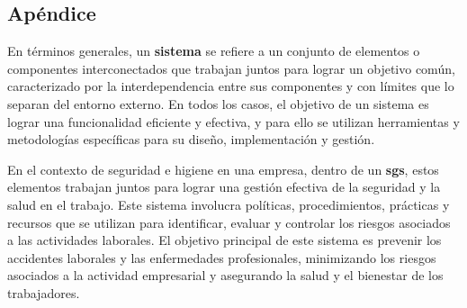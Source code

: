 \subsection{Apéndice}

En términos generales, un \textbf{\gls{sistema}} se refiere a un conjunto de
elementos o componentes interconectados que trabajan juntos para lograr un 
objetivo común, caracterizado por la interdependencia entre sus componentes y 
con límites que lo separan del entorno externo. En todos los casos, el objetivo
de un sistema es lograr una funcionalidad eficiente y efectiva, y para ello se
utilizan herramientas y metodologías específicas para su diseño, implementación
y gestión.

En el contexto de seguridad e higiene en una empresa, dentro de un 
\textbf{\gls{sgs}}, estos elementos trabajan juntos para lograr una gestión 
efectiva de la seguridad y la salud en el trabajo. Este sistema involucra 
políticas, procedimientos, prácticas y recursos que se utilizan para 
identificar, evaluar y controlar los riesgos asociados a las actividades 
laborales. El objetivo principal de este sistema es prevenir los accidentes 
laborales y las enfermedades profesionales, minimizando los riesgos asociados a
la actividad empresarial y asegurando la salud y el bienestar de los 
trabajadores.

